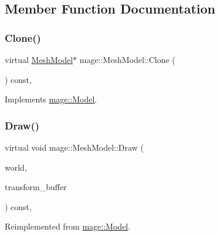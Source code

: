 \subsection{Member Function Documentation}
\hypertarget{classmage_1_1_mesh_model_a7130eca9a1dac038c33b838c15138161}{}\label{classmage_1_1_mesh_model_a7130eca9a1dac038c33b838c15138161} 
\subsubsection{\texorpdfstring{Clone()}{Clone()}}
{\footnotesize\ttfamily virtual \hyperlink{classmage_1_1_mesh_model}{Mesh\+Model}$\ast$ mage\+::\+Mesh\+Model\+::\+Clone (\begin{DoxyParamCaption}{ }\end{DoxyParamCaption}) const\hspace{0.3cm}{\ttfamily [override]}, {\ttfamily [virtual]}}



Implements \hyperlink{classmage_1_1_model_ae5e9bee52da0db8c7a29920c13ed40ea}{mage\+::\+Model}.

\hypertarget{classmage_1_1_mesh_model_a3e0f9f6d78e00f264d4611f809961c8a}{}\label{classmage_1_1_mesh_model_a3e0f9f6d78e00f264d4611f809961c8a} 
\subsubsection{\texorpdfstring{Draw()}{Draw()}}
{\footnotesize\ttfamily virtual void mage\+::\+Mesh\+Model\+::\+Draw (\begin{DoxyParamCaption}\item[{const \hyperlink{classmage_1_1_world}{World} \&}]{world,  }\item[{const \hyperlink{structmage_1_1_transform_buffer}{Transform\+Buffer} \&}]{transform\+\_\+buffer }\end{DoxyParamCaption}) const\hspace{0.3cm}{\ttfamily [override]}, {\ttfamily [virtual]}}



Reimplemented from \hyperlink{classmage_1_1_model_a0252d4e8ce355600347962c994531a88}{mage\+::\+Model}.

\hypertarget{classmage_1_1_mesh_model_ab7785be4bca18d9f9ef2f42ce3b727db}{}\label{classmage_1_1_mesh_model_ab7785be4bca18d9f9ef2f42ce3b727db} 
